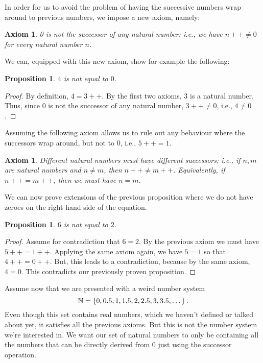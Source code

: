 \documentclass[a4paper, twocolumn]{report}
\newcounter{dummy} \numberwithin{dummy}{section}
\newcounter{axmcntr} \numberwithin{axmcntr}{chapter}
\newtheorem{axm}[axmcntr]{Axiom}
\newtheorem{prp}[dummy]{Proposition}
\theoremstyle{definition}
\theoremstyle{solution}
\newcommand{\dplus}{{+}{+}} %
\begin{document}
In order for us to avoid the problem of having the successive numbers wrap
around to previous numbers, we impose a new axiom, namely:

\begin{axm}
  \label{axm_23}
  0 is not the successor of any natural number: i.e., we have $n\dplus \neq 0$ for
  every natural number $n$.
\end{axm}

\addtocounter{dummy}{1}

We can, equipped with this new axiom, show for example the following:

\begin{prp}
  \label{prp_216}
  $4$ is not equal to $0$.
\end{prp}
\begin{proof}
  By definition, $4 = 3\dplus$. By the first two axioms, $3$ is a natural number.
  Thus, since $0$ is not the successor of any natural number, $3\dplus \neq 0$,
  i.e., $4 \neq 0$. 
\end{proof}
\addtocounter{dummy}{1}
Assuming the following axiom allows us to rule out any behaviour where the
successors wrap around, but not to $0$, i.e., $5\dplus = 1$.
\begin{axm}
  \label{axm_24}
  Different natural numbers must have different successors; i.e., if $n, m$ are
  natural numbers and $n \neq m$, then $n\dplus \neq m\dplus$. Equivalently, if $n\dplus =
  m\dplus$, then we must have $n = m$.
\end{axm}

We can now prove extensions of the previous proposition where we do not have zeroes
on the right hand side of the equation.

\begin{prp}
  \label{prp_218}
  $6$ is not equal to $2$.
\end{prp}
\begin{proof}
  Assume for contradiction that $6 = 2$. By the previous axiom we must have
  $5\dplus = 1\dplus$.  Applying the same axiom again, we have $5 = 1$ so that $4\dplus =
  0\dplus$. But, this leads to a contradiction, because by the same axiom, $4 = 0$.
  This contradicts our previously proven proposition.
\end{proof}

\addtocounter{dummy}{1}
Assume now that we are presented with a weird number system
\begin{equation}
  \notag
  \mathbb{N} = \left\{ 0, 0.5, 1, 1.5, 2, 2.5, 3, 3.5, \dots \right\}.
\end{equation}
Even though this set contains real numbers, which we haven't defined or talked
about yet, it satisfies all the previous axioms. But this is not the number
system we're interested in. We want our set of natural numbers to only be
containing all the numbers that can be directly derived from $0$ just using the
successor operation.
\end{document}
